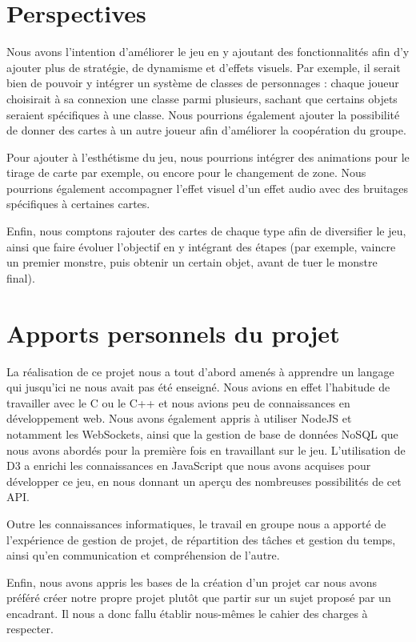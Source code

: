 \documentclass[12pt]{report}
\begin{document}
    \section*{Perspectives}

    Nous avons l'intention d'améliorer le jeu en y ajoutant des fonctionnalités afin d'y ajouter plus de stratégie, de dynamisme et d'effets visuels. Par exemple, il serait bien de pouvoir y intégrer un système de classes de personnages : chaque joueur choisirait à sa connexion une classe parmi plusieurs, sachant que certains objets seraient spécifiques à une classe. Nous pourrions également ajouter la possibilité de donner des cartes à un autre joueur afin d'améliorer la coopération du groupe.

    Pour ajouter à l'esthétisme du jeu, nous pourrions intégrer des animations pour le tirage de carte par exemple, ou encore pour le changement de zone. Nous pourrions également accompagner l'effet visuel d'un effet audio avec des bruitages spécifiques à certaines cartes.

    Enfin, nous comptons rajouter des cartes de chaque type afin de diversifier le jeu, ainsi que faire évoluer l'objectif en y intégrant des étapes (par exemple, vaincre un premier monstre, puis obtenir un certain objet, avant de tuer le monstre final).

    \section*{Apports personnels du projet}

    La réalisation de ce projet nous a tout d'abord amenés à apprendre un langage qui jusqu'ici ne nous avait pas été enseigné. Nous avions en effet l'habitude de travailler avec le C ou le C++ et nous avions peu de connaissances en développement web. Nous avons également appris à utiliser NodeJS et notamment les WebSockets, ainsi que la gestion de base de données NoSQL que nous avons abordés pour la première fois en travaillant sur le jeu. L'utilisation de D3 a enrichi les connaissances en JavaScript que nous avons acquises pour développer ce jeu, en nous donnant un aperçu des nombreuses possibilités de cet API.

    Outre les connaissances informatiques, le travail en groupe nous a apporté de l'expérience de gestion de projet, de répartition des tâches et gestion du temps, ainsi qu'en communication et compréhension de l'autre.

    Enfin, nous avons appris les bases de la création d'un projet car nous avons préféré créer notre propre projet plutôt que partir sur un sujet proposé par un encadrant. Il nous a donc fallu établir nous-mêmes le cahier des charges à respecter.
\end{document}
